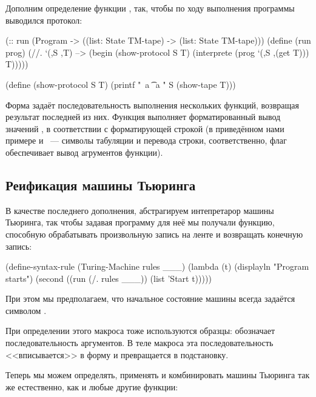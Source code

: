 Дополним определение функции , так, чтобы по ходу выполнения программы выводился протокол:
\begin{Definition}[emph={S,T,prog}]
(:: run (Program -> ((list: State TM-tape) -> 
                     (list: State TM-tape)))
 (define (run prog)
   (//. `(,S ,T) --> (begin
                       (show-protocol S T)
                       (interprete (prog `(,S ,(get T))) T)))))%

(define (show-protocol S T)
  (printf "~a \t ~a \n" S (show-tape T)))
\end{Definition}

Форма  задаёт последовательность выполнения нескольких функций, возвращая результат последней из них. Функция  выполняет форматированный вывод значений , в соответствии с форматирующей строкой  (в приведённом нами примере  и ~--- символы табуляции и перевода строки, соответственно, флаг  обеспечивает вывод агрументов функции).

\subsection*{Реификация машины Тьюринга}
В качестве последнего дополнения, абстрагируем интепретарор машины Тьюринга, так чтобы задавая программу для неё мы получали функцию, способную обрабатывать произвольную запись на ленте и возвращать конечную запись:

\begin{Definition}[emph={l,rules}]
(define-syntax-rule (Turing-Machine rules ___)
  (lambda (t)
    (displayln "Program starts")
    (second ((run (/. rules ___)) (list 'Start t)))))
\end{Definition}

\noindent При этом мы предполагаем, что начальное состояние машины всегда задаётся символом . 

При определении этого макроса тоже используются образцы:  обозначает последовательность аргументов. В теле макроса эта последовательность <<вписывается>> в форму  и превращается в подстановку.

Теперь мы можем определять, применять и комбинировать машины Тьюринга так же естественно, как и любые другие функции:

